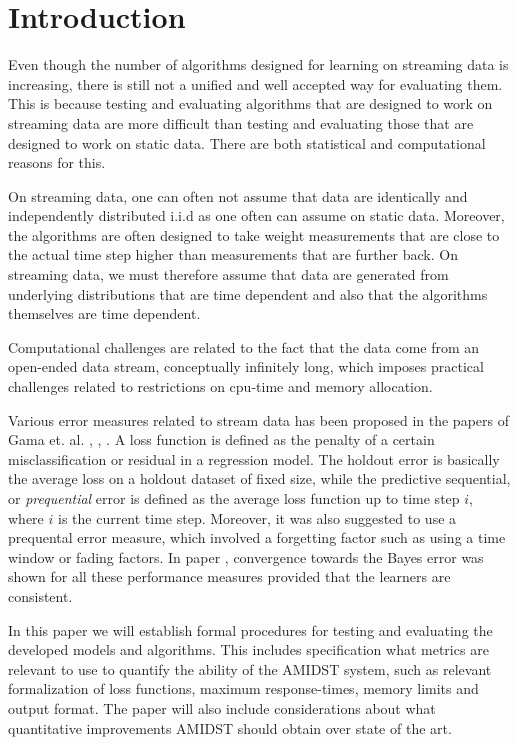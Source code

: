 \section{Introduction}

Even though the number of algorithms designed for learning on streaming data is increasing, there is still not a unified and well accepted way for evaluating them.  This is because testing and evaluating algorithms that are designed to work on streaming data are more difficult than testing and evaluating those that are designed to work on static data.  There are both statistical and computational reasons for this.  

On streaming data, one can often not assume that data are identically and independently distributed i.i.d as one often can assume on static data.  Moreover, the algorithms are often designed to take weight measurements that are close to the actual time step higher than measurements that are further back.  On streaming data, we must therefore assume that data are generated from underlying distributions that are time dependent and also that the algorithms themselves are time dependent.  

Computational challenges are related to the fact that the data come from an open-ended data stream, conceptually infinitely long, which imposes practical challenges related to restrictions on cpu-time and memory allocation.  

Various error measures related to stream data has been proposed in the papers of Gama et. al. \cite{Gam09}, \cite{Gam09_2}, \cite{Gam12}.  A loss function is defined as the penalty of a certain misclassification or residual in a regression model.  The holdout error is basically the average loss on a holdout dataset of fixed size, while the predictive sequential, or \emph{prequential} error is defined as the average loss function up to time step $i$, where $i$ is the current time step.  Moreover, it was also suggested to use a prequental error measure, which involved a forgetting factor such as using a time window or fading factors.  In paper \cite{Gam12}, convergence towards the Bayes error was shown for all these performance measures provided that the learners are consistent.  






In this paper we will establish formal procedures for testing and evaluating the developed models and algorithms. This includes specification what metrics are relevant to use to quantify the ability of the AMIDST system, such as relevant formalization of loss functions, maximum response-times, memory limits and output format.  The paper will also include 
considerations about what quantitative improvements AMIDST should obtain over state of the art.

